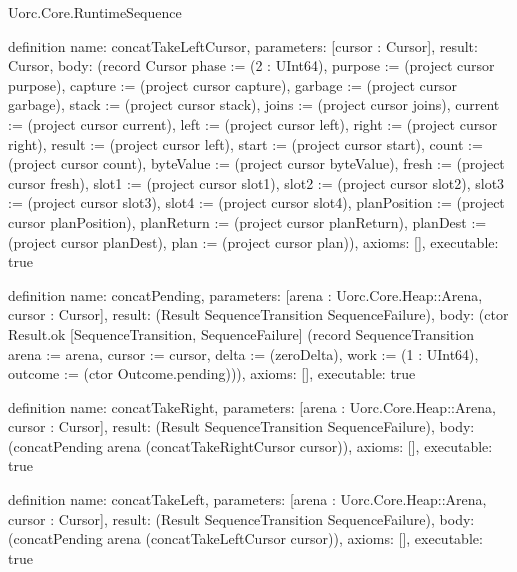 \begin{lexlean}{Uorc.Core.RuntimeSequence}
\begin{semanticmodule}
definition{
  name: concatTakeLeftCursor,
  parameters: [cursor : Cursor],
  result: Cursor,
  body: (record Cursor {phase := (2 : UInt64), purpose := (project cursor purpose), capture := (project cursor capture), garbage := (project cursor garbage), stack := (project cursor stack), joins := (project cursor joins), current := (project cursor current), left := (project cursor left), right := (project cursor right), result := (project cursor left), start := (project cursor start), count := (project cursor count), byteValue := (project cursor byteValue), fresh := (project cursor fresh), slot1 := (project cursor slot1), slot2 := (project cursor slot2), slot3 := (project cursor slot3), slot4 := (project cursor slot4), planPosition := (project cursor planPosition), planReturn := (project cursor planReturn), planDest := (project cursor planDest), plan := (project cursor plan)}),
  axioms: [],
  executable: true
}

definition{
  name: concatPending,
  parameters: [arena : Uorc.Core.Heap::Arena, cursor : Cursor],
  result: (Result SequenceTransition SequenceFailure),
  body: (ctor Result.ok [SequenceTransition, SequenceFailure] (record SequenceTransition {arena := arena, cursor := cursor, delta := (zeroDelta), work := (1 : UInt64), outcome := (ctor Outcome.pending)})),
  axioms: [],
  executable: true
}

definition{
  name: concatTakeRight,
  parameters: [arena : Uorc.Core.Heap::Arena, cursor : Cursor],
  result: (Result SequenceTransition SequenceFailure),
  body: (concatPending arena (concatTakeRightCursor cursor)),
  axioms: [],
  executable: true
}

definition{
  name: concatTakeLeft,
  parameters: [arena : Uorc.Core.Heap::Arena, cursor : Cursor],
  result: (Result SequenceTransition SequenceFailure),
  body: (concatPending arena (concatTakeLeftCursor cursor)),
  axioms: [],
  executable: true
}


\end{semanticmodule}
\end{lexlean}
